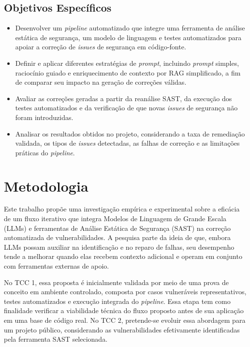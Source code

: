 \subsection{Objetivos Específicos}
\begin{itemize}
\item Desenvolver um \textit{pipeline} automatizado que integre uma ferramenta de análise estática de segurança, um modelo de linguagem e testes automatizados para apoiar a correção de \textit{issues} de segurança em código-fonte.

\item Definir e aplicar diferentes estratégias de \textit{prompt}, incluindo \textit{prompt} simples, raciocínio guiado e enriquecimento de contexto por RAG simplificado, a fim de comparar seu impacto na geração de correções válidas.

\item Avaliar as correções geradas a partir da reanálise SAST, da execução dos testes automatizados e da verificação de que novas \textit{issues} de segurança não foram introduzidas.

\item Analisar os resultados obtidos no projeto, considerando a taxa de remediação validada, os tipos de \textit{issues} detectadas, as falhas de correção e as limitações práticas do \textit{pipeline}.

\end{itemize}


\section{Metodologia}
Este trabalho propõe uma investigação empírica e experimental sobre a eficácia de um fluxo iterativo que integra Modelos de Linguagem de Grande Escala (LLMs) e ferramentas de Análise Estática de Segurança (SAST) na correção automatizada de vulnerabilidades. A pesquisa parte da ideia de que, embora LLMs possam auxiliar na identificação e no reparo de falhas, seu desempenho tende a melhorar quando elas recebem contexto adicional e operam em conjunto com ferramentas externas de apoio.

No TCC 1, essa proposta é inicialmente validada por meio de uma prova de conceito em ambiente controlado, composta por casos vulneráveis representativos, testes automatizados e execução integrada do \textit{pipeline}. Essa etapa tem como finalidade verificar a viabilidade técnica do fluxo proposto antes de sua aplicação em uma base de código real. No TCC 2, pretende-se evoluir essa abordagem para um projeto público, considerando as vulnerabilidades efetivamente identificadas pela ferramenta SAST selecionada.


